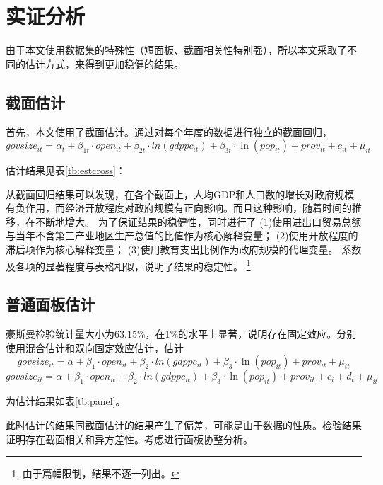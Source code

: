 \documentclass[10pt]{article}
\begin{document}
\section{实证分析}
    由于本文使用数据集的特殊性（短面板、截面相关性特别强），所以本文采取了不同的估计方式，来得到更加稳健的结果。
\subsection{截面估计}
    首先，本文使用了截面估计。通过对每个年度的数据进行独立的截面回归，
    \begin{equation}
        govsize_{it} = \alpha_t + \beta_{1t} \cdot open_{it} + \beta_{2t} \cdot ln(gdppc_{it}) + \beta_{3t} \cdot \ln(pop_{it}) + prov_{it} +c_{it} + \mu_{it}
    \end{equation}


    估计结果见表\ref{tb:estcross}：



        从截面回归结果可以发现，在各个截面上，人均GDP和人口数的增长对政府规模有负作用，而经济开放程度对政府规模有正向影响。而且这种影响，随着时间的推移，在不断地增大。
        为了保证结果的稳健性，同时进行了
        (1)使用进出口贸易总额与当年不含第三产业地区生产总值的比值作为核心解释变量；
        (2)使用开放程度的滞后项作为核心解释变量；
        (3)使用教育支出比例作为政府规模的代理变量。
        系数及各项的显著程度与表格相似，说明了结果的稳定性。
    \footnote{由于篇幅限制，结果不逐一列出。}

\subsection{普通面板估计}
    豪斯曼检验统计量大小为63.15\%，在1\%的水平上显著，说明存在固定效应。分别使用混合估计和双向固定效应估计，估计
    \begin{equation}
        govsize_{it} = \alpha + \beta_{1} \cdot open_{it} + \beta_{2} \cdot ln(gdppc_{it}) + \beta_{3} \cdot \ln(pop_{it}) + prov_{it} + \mu_{it}
    \end{equation}
    \begin{equation}    
        govsize_{it} = \alpha + \beta_{1} \cdot open_{it} + \beta_{2} \cdot ln(gdppc_{it}) + \beta_{3} \cdot \ln(pop_{it}) + prov_{it} +c_{i} +d_{t} + \mu_{it}
    \end{equation}
    
    为估计结果如表\ref{tb:panel}。


    此时估计的结果同截面估计的结果产生了偏差，可能是由于数据的性质。检验结果证明存在截面相关和异方差性。考虑进行面板协整分析。
\end{document}
